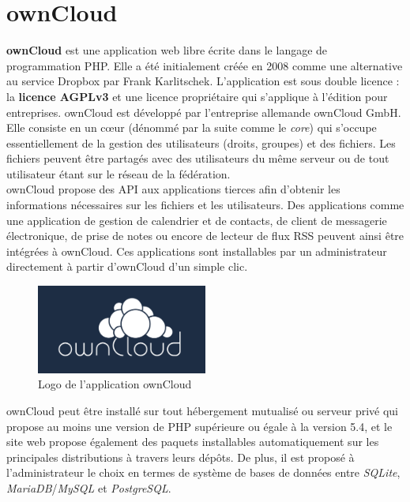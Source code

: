 \documentclass[10pt,a4paper, twoside]{report}
\begin{document}
	\section{ownCloud}
	\textbf{ownCloud} est une application web libre écrite dans le langage de programmation PHP. Elle a été initialement créée en 2008 comme une alternative au service Dropbox par Frank Karlitschek. L'application est sous double licence : la \textbf{licence AGPLv3} et une licence propriétaire qui s'applique à l'édition pour entreprises. ownCloud est développé par l'entreprise allemande ownCloud GmbH.
	\\
	
	Elle consiste en un cœur (dénommé par la suite comme le \textit{core}) qui s'occupe essentiellement de la gestion des utilisateurs (droits, groupes) et des fichiers. Les fichiers peuvent être partagés avec des utilisateurs du même serveur ou de tout utilisateur étant sur le réseau de la fédération.
	\\
	
	ownCloud propose des API aux applications tierces afin d'obtenir les informations nécessaires sur les fichiers et les utilisateurs. Des applications comme une application de gestion de calendrier et de contacts, de client de messagerie électronique, de prise de notes ou encore de lecteur de flux RSS peuvent ainsi être intégrées à ownCloud.
	Ces applications sont installables par un administrateur directement à partir d'ownCloud d'un simple clic.
	
	\begin{figure}[ht]
		\centering
		\includegraphics[width=0.5\textwidth]{images/owncloud-logo.png}
		\caption{Logo de l'application ownCloud}
		\label{normal_case}
	\end{figure}
	
	ownCloud peut être installé sur tout hébergement mutualisé ou serveur privé qui propose au moins une version de PHP supérieure ou égale à la version 5.4, et le site web propose également des paquets installables automatiquement sur les principales distributions à travers leurs dépôts. De plus, il est proposé à l'administrateur le choix en termes de système de bases de données entre \textit{SQLite}, \textit{MariaDB}/\textit{MySQL} et \textit{PostgreSQL}.
	
\end{document}
